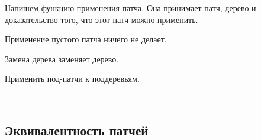 Напишем функцию применения патча. Она принимает патч, дерево и 
доказательство того, что этот патч можно применить.

\begin{code}%
\> \AgdaSymbol{:} \AgdaSymbol{\{} \AgdaSymbol{:} \AgdaSymbol{\}}  \AgdaSymbol{(} \AgdaSymbol{:}  \AgdaSymbol{)}  \AgdaSymbol{(} \AgdaSymbol{:} \AgdaSymbol{)}      \<%
\end{code}

Применение пустого патча ничего не делает.

\begin{code}%
\>   \AgdaSymbol{(} \AgdaSymbol{)} \AgdaSymbol{=} \<%
\end{code}

Замена дерева заменяет дерево. %

\begin{code}%
\>       \AgdaSymbol{(}  \AgdaSymbol{)} \AgdaSymbol{=} \<%
\end{code}

Применить под-патчи к поддеревьям.

\begin{code}%
\>      \AgdaSymbol{(}  \AgdaSymbol{)} \AgdaSymbol{(}  \AgdaSymbol{)} \AgdaSymbol{=} \<[49]%
\>[49]\<%
\\
\>[0]\<[2]%
\>[2] \AgdaSymbol{(}   \AgdaSymbol{)} \AgdaSymbol{(}   \AgdaSymbol{)}\<%
\end{code}

\subsection{Эквивалентность патчей}

